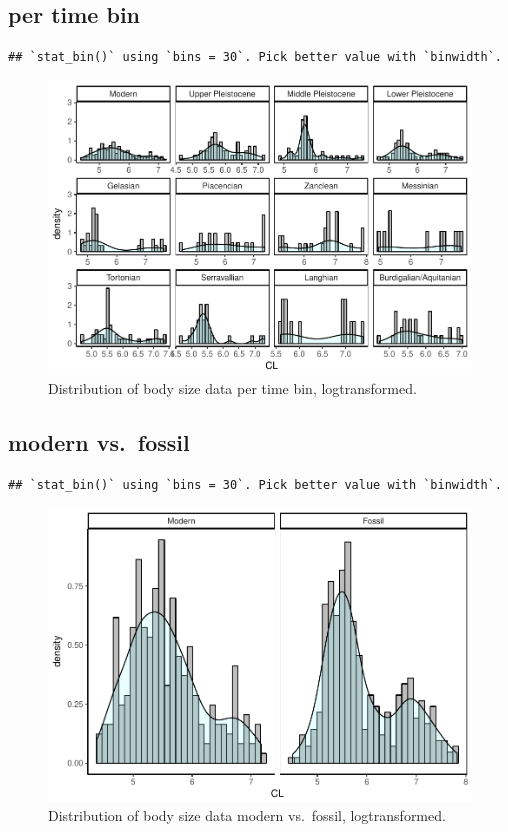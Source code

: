 \documentclass[]{article}
\begin{document}
\newpage

\subsection{per time bin}\label{per-time-bin}

\begin{verbatim}
## `stat_bin()` using `bins = 30`. Pick better value with `binwidth`.
\end{verbatim}

\begin{figure}[htbp]
\centering
\includegraphics{MA_JJ_files/figure-latex/HistBins-1.pdf}
\caption{Distribution of body size data per time bin, logtransformed.}
\end{figure}

\newpage

\subsection{modern vs.~fossil}\label{modern-vs.fossil}

\begin{verbatim}
## `stat_bin()` using `bins = 30`. Pick better value with `binwidth`.
\end{verbatim}

\begin{figure}[htbp]
\centering
\includegraphics{MA_JJ_files/figure-latex/HistFosMo-1.pdf}
\caption{Distribution of body size data modern vs.~fossil,
logtransformed.}
\end{figure}
\end{document}
